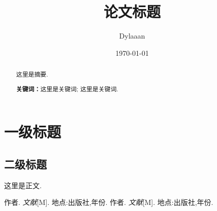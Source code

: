 \documentclass[12pt, a4paper, oneside]{ctexart}
\title{\textbf{论文标题}}
\author{Dylaaan}
\date{\today}
\begin{document}
\maketitle

\setcounter{page}{0}
\maketitle
\thispagestyle{empty}

\begin{abstract}
    这里是摘要. 
    \par\textbf{关键词：}这里是关键词; 这里是关键词. 
\end{abstract}

\newpage
{}
\setcounter{page}{1}
\tableofcontents
\newpage
\setcounter{page}{1}

\section{一级标题}

\subsection{二级标题}

这里是正文. 

\newpage

\begin{thebibliography}{99}
    作者. \emph{文献}[M]. 地点:出版社,年份.
    作者. \emph{文献}[M]. 地点:出版社,年份.
\end{thebibliography}
\end{document}

